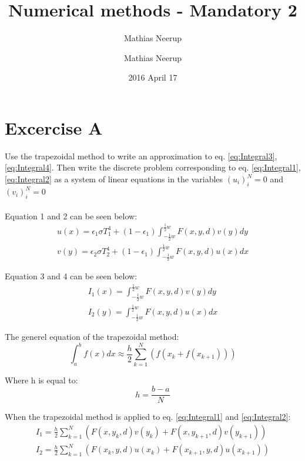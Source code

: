 \documentclass[10pt,a4paper]{article}
\author{Mathias Neerup}
\title{Numerical methods - Mandatory 2}
\author{Mathias Neerup}
\date{2016 April 17}
\begin{document}
\maketitle

\tableofcontents

\section{Excercise A}
Use the trapezoidal method to write an approximation to eq. \ref{eq:Integral3}, \ref{eq:Integral4}. Then write the discrete problem corresponding to eq. \ref{eq:Integral1}, \ref{eq:Integral2} as a system of linear equations in the variables $(u_i)^N_i=0$ and $(v_i)^N_i=0$ \\
\\
Equation 1 and 2 can be seen below: 
\begin{align}
	u(x) = \epsilon_{1}  \sigma T^{4}_ {1}+(1-\epsilon_{1})\int_{-\frac{1}{2}w}^{\frac{1}{2}w} F(x,y,d)v(y) dy \label{eq:Integral1} \\
	v(y) = \epsilon_{2}  \sigma T^{4}_ {2}+(1-\epsilon_{1})\int_{-\frac{1}{2}w}^{\frac{1}{2}w} F(x,y,d)u(x) \label{eq:Integral2} dx
\end{align}

Equation 3 and 4 can be seen below: 
\begin{align}
	I_1(x) = \int_{-\frac{1}{2}w}^{\frac{1}{2}w} F(x,y,d)v(y) dy \label{eq:Integral3} \\
	I_2(y) = \int_{-\frac{1}{2}w}^{\frac{1}{2}w} F(x,y,d)u(x) \label{eq:Integral4} dx
\end{align}

The generel equation of the trapezoidal method:
\begin{equation}
\int_{a}^{b}f(x) dx  \approx \frac{h}{2} \sum_{k=1}^{N}(f(x_{k}+f(x_{k+1})))
\end{equation}

Where h is equal to:
\begin{equation}
h=\frac{b-a}{N}
\end{equation}

When the trapezoidal method is applied to eq. \ref{eq:Integral1} and \ref{eq:Integral2}:
\begin{align}
I_{1} =  \frac{h}{2} \sum_{k=1}^{N}( F(x,y_{k},d)v(y_{k}) + F(x,y_{k+1},d)v(y_{k+1})) \\
I_{2} =  \frac{h}{2} \sum_{k=1}^{N}( F(x_{k},y,d)u(x_{k}) + F(x_{k+1},y,d)u(x_{k+1}))
\end{align}
\end{document}
